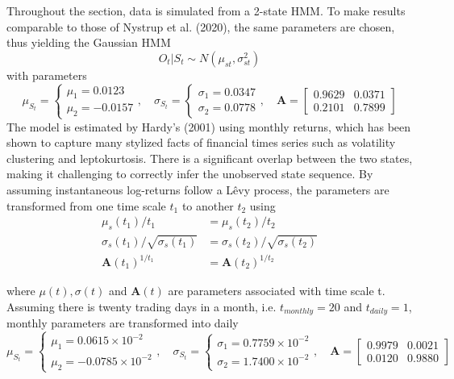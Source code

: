 Throughout the section, data is simulated from a 2-state HMM. To make results comparable to those of Nystrup et al. (2020), the same parameters are chosen, thus yielding the Gaussian HMM
\begin{equation*}
    O_t|S_t \sim N(\mu_{st}, \sigma_{st}^2)
\end{equation*}
with parameters
$$
    \mu_{S_t}=
    \begin{cases}
        \mu_1= 0.0123 \\
        \mu_2= -0.0157
    \end{cases}, \quad
    \sigma_{S_t} =
    \begin{cases}
        \sigma_1 = 0.0347 \\
        \sigma_2 = 0.0778
    \end{cases}, \quad
    \mathbf{A} = 
    \begin{bmatrix}
        0.9629 & 0.0371 \\
        0.2101 & 0.7899
    \end{bmatrix}
$$
The model is estimated by Hardy's (2001) using monthly returns, which has been shown to capture many stylized facts of financial times series such as volatility clustering and leptokurtosis. There is a significant overlap between the two states, making it challenging to correctly infer the unobserved state sequence. By assuming instantaneous log-returns follow a Lêvy process, the parameters are transformed from one time scale $t_1$ to another $t_2$ using
\begin{align*}
    \mu_s(t_1) / t_1 &= \mu_s(t_2) / t_2 \\
    \sigma_s(t_1) / \sqrt{\sigma_s(t_1)} &= \sigma_s(t_2) / \sqrt{\sigma_s(t_2)} \\
    \mathbf{A}(t_1)^{1/t_1} &= \mathbf{A}(t_2)^{1/t_2}
\end{align*}

where $\mu(t), \sigma(t)$ and $\mathbf{A}(t)$ are parameters associated with time scale t. Assuming there is twenty trading days in a month, i.e. $t_{monthly}=20$ and $t_{daily}=1$, monthly parameters are transformed into daily
$$
    \mu_{S_t}=
    \begin{cases}
        \mu_1= 0.0615 \times 10^{-2} \\
        \mu_2= -0.0785 \times 10^{-2}
    \end{cases}, \quad
    \sigma_{S_t} =
    \begin{cases}
        \sigma_1 = 0.7759 \times 10^{-2} \\
        \sigma_2 = 1.7400 \times 10^{-2}
    \end{cases}, \quad
    \mathbf{A} = 
    \begin{bmatrix}
        0.9979 & 0.0021 \\
        0.0120 & 0.9880
    \end{bmatrix}
$$


